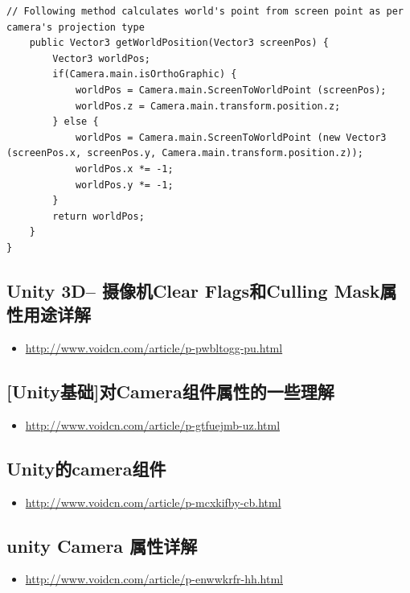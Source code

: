 \documentclass[9pt, b5paper]{article}
\begin{document}
\begin{itemize}
\begin{verbatim}
// Following method calculates world's point from screen point as per camera's projection type
    public Vector3 getWorldPosition(Vector3 screenPos) {
        Vector3 worldPos;
        if(Camera.main.isOrthoGraphic) {
            worldPos = Camera.main.ScreenToWorldPoint (screenPos);
            worldPos.z = Camera.main.transform.position.z;
        } else {
            worldPos = Camera.main.ScreenToWorldPoint (new Vector3 (screenPos.x, screenPos.y, Camera.main.transform.position.z));
            worldPos.x *= -1;
            worldPos.y *= -1;
        }
        return worldPos;
    }
}
\end{verbatim}
\end{itemize}

\subsection{Unity 3D-- 摄像机Clear Flags和Culling Mask属性用途详解}
\label{sec:org1aba5fb}
\begin{itemize}
\item \url{http://www.voidcn.com/article/p-pwbltogg-pu.html}
\end{itemize}

\subsection{[Unity基础]对Camera组件属性的一些理解}
\label{sec:org7667928}
\begin{itemize}
\item \url{http://www.voidcn.com/article/p-gtfuejmb-uz.html}
\end{itemize}

\subsection{Unity的camera组件}
\label{sec:orgb075975}
\begin{itemize}
\item \url{http://www.voidcn.com/article/p-mcxkifby-cb.html}
\end{itemize}

\subsection{unity Camera 属性详解}
\label{sec:org17d1316}
\begin{itemize}
\item \url{http://www.voidcn.com/article/p-enwwkrfr-hh.html}
\end{itemize}
\end{document}
